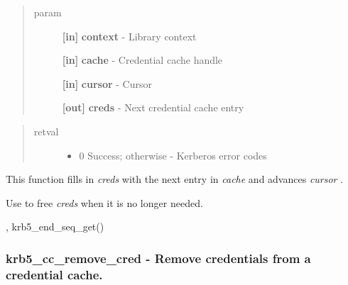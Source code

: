 \documentclass[letterpaper,10pt,english]{sphinxmanual}
\begin{document}
\begin{quote}\begin{description}
\item[{param}] \leavevmode
\textbf{{[}in{]}} \textbf{context} - Library context

\textbf{{[}in{]}} \textbf{cache} - Credential cache handle

\textbf{{[}in{]}} \textbf{cursor} - Cursor

\textbf{{[}out{]}} \textbf{creds} - Next credential cache entry

\end{description}\end{quote}
\begin{quote}\begin{description}
\item[{retval}] \leavevmode\begin{itemize}
\item {} 
0   Success; otherwise - Kerberos error codes

\end{itemize}

\end{description}\end{quote}

This function fills in \emph{creds} with the next entry in \emph{cache} and advances \emph{cursor} .

Use {\hyperref[appdev/refs/api/krb5_free_cred_contents:c.krb5_free_cred_contents]{}} to free \emph{creds} when it is no longer needed.




{\hyperref[appdev/refs/api/krb5_cc_start_seq_get:c.krb5_cc_start_seq_get]{}} , krb5\_end\_seq\_get()




\subsubsection{krb5\_cc\_remove\_cred -  Remove credentials from a credential cache.}
\label{appdev/refs/api/krb5_cc_remove_cred:krb5-cc-remove-cred-remove-credentials-from-a-credential-cache}\label{appdev/refs/api/krb5_cc_remove_cred::doc}

\begin{fulllineitems}
\label{appdev/refs/api/krb5_cc_remove_cred:c.krb5_cc_remove_cred}
\end{fulllineitems}
\end{document}
